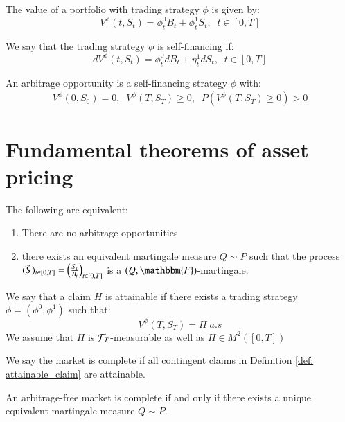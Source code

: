 \begin{definition}
The value of a portfolio with trading strategy $\phi$ is given by:
$$
V^{\phi}(t,S_{t}) = \phi_{t}^{0}B_{t} + \phi_{t}^{1}S_{t},\;\; t \in[0,T]
$$
\end{definition}


\begin{definition}
We say that the trading strategy $\phi$ is self-financing if:
$$
dV^{\phi}(t,S_{t}) = \phi_{t}^{0}dB_{t} + \eta_{t}^{1}dS_{t}, \;\; t\in [0,T] 
$$
\end{definition}

\begin{definition}
An arbitrage opportunity is a self-financing strategy $\phi$ with:
\begin{align*}
V^{\phi}(0,S_{0}) = 0, \;\; V^{\phi}(T,S_{T}) \geq 0, \;\; P(V^{\phi}(T,S_{T}) \geq 0) > 0    
\end{align*}
\end{definition}


\section{Fundamental theorems of asset pricing}

\begin{theorem}
\label{thm: First_fundamental_thm_asset_price}
The following are equivalent:
\begin{enumerate}[label=\roman*]
    \item There are no arbitrage opportunities
    \item there exists an equivalent martingale measure $Q\sim P$ such that the process $(\Tilde{S})_{t \in [0,T]} = \left(\frac{S_{t}}{B_{t}}\right)_{t\in [0,T]}$ is a $(Q, \mathbbm{F})$-martingale. 
\end{enumerate}
\end{theorem}

\begin{definition}
\label{def: attainable_claim}
We say that a claim $H$ is attainable if there exists a trading strategy $\phi = (\phi^{0}, \phi^{1})$ such that:
$$
V^{\phi}(T,S_{T}) = H \; a.s
$$
We assume that $H$ is $\mathcal{F}_{T}$-measurable as well as $H\in M^{2}([0,T])$
\end{definition}

\begin{definition}
We say the market is complete if all contingent claims in Definition \ref{def: attainable_claim} are attainable.     
\end{definition}

\begin{theorem}
An arbitrage-free market is complete if and only if there exists a unique equivalent martingale measure $Q\sim P$.    
\end{theorem}